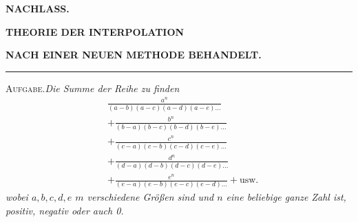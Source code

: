 \clearpage
{}
\begingroup
\renewcommand{\arraystretch}{1.35}
\begin{center}\textbf{NACHLASS.}\par\bigskip
\textbf{THEORIE DER INTERPOLATION}\par\medskip
\textbf{NACH EINER NEUEN METHODE BEHANDELT.}\par\medskip
\rule{.15\linewidth}{.4pt}\end{center}
\textsc{Aufgabe.}\quad\textit{Die Summe der Reihe zu finden}
\[
\begin{aligned}
&\frac{a^n}{(a-b)(a-c)(a-d)(a-e)\ldots}\\[5pt]
&+\frac{b^n}{(b-a)(b-c)(b-d)(b-e)\ldots}\\
&+\frac{c^n}{(c-a)(c-b)(c-d)(c-e)\ldots}\\[5pt]
&+\frac{d^n}{(d-a)(d-b)(d-c)(d-e)\ldots}\\
&+\frac{e^n}{(e-a)(e-b)(e-c)(e-d)\ldots}+\text{usw.}
\end{aligned}
\]
\textit{wobei $a,b,c,d,e$ $m$ verschiedene Größen sind und $n$ eine beliebige ganze Zahl ist, positiv, negativ oder auch 0.}

